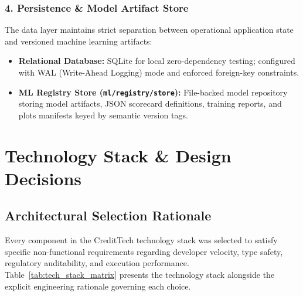 \documentclass[11pt,a4paper,oneside]{report}
\begin{document}
\subsection{4. Persistence \& Model Artifact Store}
The data layer maintains strict separation between operational application state and versioned machine learning artifacts:
\begin{itemize}
  \item \textbf{Relational Database:} SQLite for local zero-dependency testing; configured with WAL (Write-Ahead Logging) mode and enforced foreign-key constraints.
  \item \textbf{ML Registry Store (\texttt{ml/registry/store}):} File-backed model repository storing model artifacts, JSON scorecard definitions, training reports, and plots manifests keyed by semantic version tags.
\end{itemize}




\chapter{Technology Stack \& Design Decisions}
\label{chap:technology_stack}

\section{Architectural Selection Rationale}
Every component in the CreditTech technology stack was selected to satisfy specific non-functional requirements regarding developer velocity, type safety, regulatory auditability, and execution performance. Table~\ref{tab:tech_stack_matrix} presents the technology stack alongside the explicit engineering rationale governing each choice.
\end{document}

